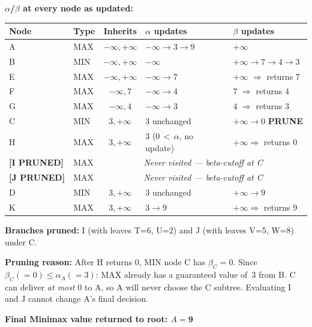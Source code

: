 \documentclass[12pt, a4paper]{article}
\newenvironment{answerbox}{\begin{mdframed}[style=answerframe]}{\end{mdframed}}
\newcommand{\pruned}[1]{\textcolor{prunered}{\textbf{[#1 PRUNED]}}}
\begin{document}
\begin{answerbox}
\textbf{$\alpha$/$\beta$ at every node as updated:}

\begin{center}
\begin{tabular}{llcll}
\toprule
\textbf{Node} & \textbf{Type} & \textbf{Inherits} & \textbf{$\alpha$ updates} & \textbf{$\beta$ updates}\\
\midrule
A       & MAX & $-\infty,+\infty$ & $-\infty{\to}3{\to}9$   & $+\infty$           \\
B       & MIN & $-\infty,+\infty$ & $-\infty$               & $+\infty{\to}7{\to}4{\to}3$ \\
\quad E & MAX & $-\infty,+\infty$ & $-\infty{\to}7$         & $+\infty$ $\Rightarrow$ returns 7 \\
\quad F & MAX & $-\infty,7$       & $-\infty{\to}4$         & $7$ $\Rightarrow$ returns 4   \\
\quad G & MAX & $-\infty,4$       & $-\infty{\to}3$         & $4$ $\Rightarrow$ returns 3   \\
\midrule
C       & MIN & $3,+\infty$       & 3 unchanged             & $+\infty{\to}0$ \textbf{PRUNE}\\
\quad H & MAX & $3,+\infty$       & 3 (0\,$<$\,$\alpha$, no update) & $+\infty \Rightarrow$ returns 0\\
\quad \pruned{I} & MAX & \multicolumn{3}{c}{\textit{Never visited --- beta-cutoff at C}}\\
\quad \pruned{J} & MAX & \multicolumn{3}{c}{\textit{Never visited --- beta-cutoff at C}}\\
\midrule
D       & MIN & $3,+\infty$       & 3 unchanged             & $+\infty{\to}9$ \\
\quad K & MAX & $3,+\infty$       & $3{\to}9$               & $+\infty \Rightarrow$ returns 9\\
\bottomrule
\end{tabular}
\end{center}

\medskip
\textbf{Branches pruned:} I (with leaves T=6, U=2) and J (with leaves V=5, W=8) under C.

\textbf{Pruning reason:} After H returns 0, MIN node C has $\beta_C = 0$.
Since $\beta_C (=0) \leq \alpha_A (=3)$: MAX already has a guaranteed value of~3 from B.
C can deliver \textit{at most} 0 to A, so A will never choose the C subtree.
Evaluating I and J cannot change A's final decision.

\textbf{Final Minimax value returned to root: $A = \mathbf{9}$}
\end{answerbox}
\end{document}

